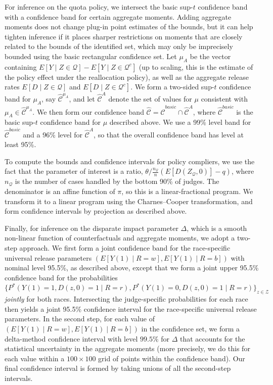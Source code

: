 \documentclass[12pt]{article}%
\theoremstyle{definition}
\newcommand\1{\operatorname{I}\indicatorfence}
\begin{document}
\begin{appendices}
For inference on the quota policy, we intersect the basic sup-$t$ confidence band with a confidence band for certain aggregate moments. Adding aggregate moments does not change plug-in point estimates of the bounds, but it can help tighten inference if it places sharper restrictions on moments that are closely related to the bounds of the identified set, which may only be imprecisely bounded using the basic rectangular confidence set. Let $\mu_A$ be the vector containing $E[Y\mid Z\in \mathcal{Q}]-E[Y\mid Z\in \mathcal{Q}^c]$ (up to scaling, this is
the estimate of the policy effect under the reallocation policy), as well as the
aggregate release rates $E[D\mid Z\in\mathcal{Q}]$ and
$E[D\mid Z\in\mathcal{Q}^c]$. We form a two-sided sup-$t$ confidence band for $\mu_A$, say $\hat{\mathcal{C}}^{\mu_A}$, and let $\hat{\mathcal{C}}^A$ denote the set of values for $\mu$ consistent with $\mu_A \in \hat{\mathcal{C}}^{\mu_A}$. We then form our confidence band $\hat{\mathcal{C}} = \hat{\mathcal{C}}^{basic} \cap \hat{\mathcal{C}}^{A}$, where $\hat{\mathcal{C}}^{basic}$ is the basic sup-$t$ confidence band for $\mu$ described above. We use a 99\% level band for $\hat{\mathcal{C}}^{basic}$ and a 96\% level for $\hat{\mathcal{C}}^A$, so that the overall confidence band has level at least 95\%.

To compute the bounds and confidence intervals for policy compliers, we use the
fact that the parameter of interest is a ratio,
$\theta/\frac{n_{\mathcal{Q}}}{n}(E[D(Z_\mathcal{Q}, 0)]-q)$, where
$n_{\mathcal{Q}}$ is the number of cases handled by the bottom 90\% of judges.
The denominator is an affine function of $\pi$, so this is a linear-fractional
program. We transform it to a linear program using the Charnes–Cooper
transformation, and form confidence intervals by projection as described above.

Finally, for inference on the disparate impact parameter $\Delta$, which is a smooth non-linear function of counterfactuals and aggregate moments, we adopt a
two-step approach. We first form a joint confidence band for the race-specific universal release parameters
$(E[Y(1) \mid R=w], E[Y(1) \mid R=b])$ with nominal level 95.5\%, as described
above, except that we form a joint upper 95.5\% confidence band for the
probabilities
$\{P^*(Y(1)=1, D(z,0)=1\mid R=r), P^*(Y(1)=0, D(z,0)=1\mid
R=r)\}_{z\in\mathcal{Z}}$ \emph{jointly} for both races. Intersecting the
judge-specific probabilities for each race then yields a joint 95.5\% confidence
interval for the race-specific universal release parameters. In the second step,
for each value of $(E[Y(1) \mid R=w], E[Y(1) \mid R=b])$ in the confidence set,
we form a delta-method confidence interval with level $99.5\%$ for $\Delta$ that
accounts for the statistical uncertainty in the aggregate moments (more
precisely, we do this for each value within a $100 \times 100$ grid of points
within the confidence band). Our final confidence interval is formed by taking
unions of all the second-step intervals.






\end{appendices}
\end{document}
